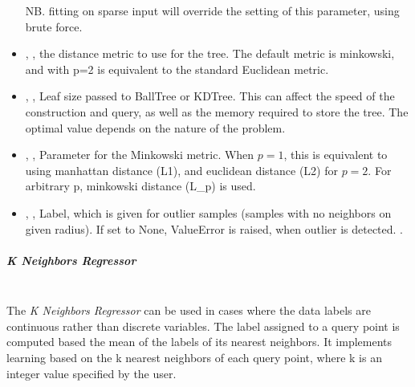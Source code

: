 \begin{itemize}
  NB.
  fitting on sparse input will override the setting of this parameter, using
  brute force.
  \item {} , ,
  the distance metric to use for the tree.
  The default metric is minkowski, and with p=2 is equivalent to the standard
  Euclidean metric.
  \item {} , ,
  Leaf size passed to BallTree or KDTree.
  This can affect the speed of the construction and query, as well as the memory
  required to store the tree.
  The optimal value depends on the nature of the problem.
  \item {} , ,
  Parameter for the Minkowski metric.
  When $p = 1$, this is equivalent to using manhattan distance (L1), and
  euclidean distance (L2) for $p = 2$.
  For arbitrary p, minkowski distance (L\_p) is used.
  \item {} , ,
  Label, which is given for outlier samples (samples with no neighbors on given
  radius).
  If set to None, ValueError is raised, when outlier is detected.
  .
\end{itemize}
\subparagraph{K Neighbors Regressor}
\mbox{}
\\The \textit{K Neighbors Regressor} can be used in cases where the data labels
are continuous rather than discrete variables.
%
The label assigned to a query point is computed based the mean of the labels of
its nearest neighbors.
%
It implements learning based on the k nearest neighbors of each query point,
where k is an integer value specified by the user.
%
